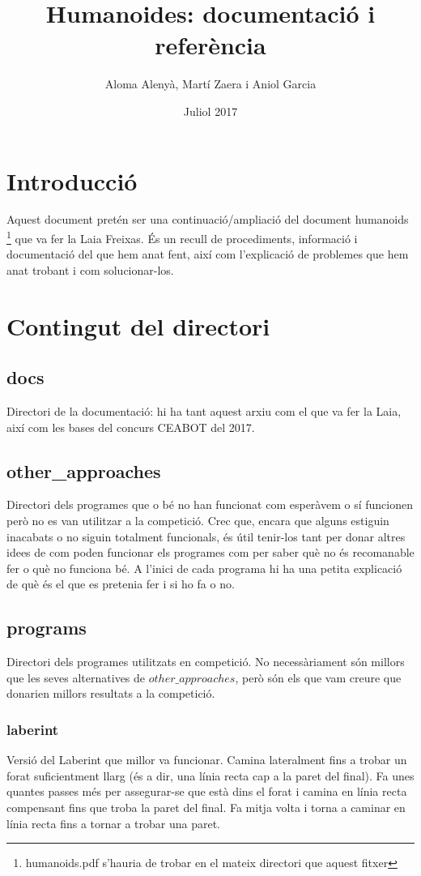 \documentclass{article}
\title{Humanoides: documentació i referència} %
\author{Aloma Alenyà, Martí Zaera i Aniol Garcia}
\date{Juliol 2017}
\begin{document}
\maketitle
\section{Introducció}
Aquest document pretén ser una continuació/ampliació del document humanoids \footnote{humanoids.pdf s'hauria de trobar en el mateix directori que aquest fitxer} que va fer la Laia Freixas. És un recull de procediments, informació i documentació del que hem anat fent, així com l'explicació de problemes que hem anat trobant i com solucionar-los. 
\section{Contingut del directori}
\subsection{docs}
Directori de la documentació: hi ha tant aquest arxiu com el que va fer la Laia, així com les bases del concurs CEABOT del 2017.
\subsection{other\_approaches}
Directori dels programes que o bé no han funcionat com esperàvem o sí funcionen però no es van utilitzar a la competició. Crec que, encara que alguns estiguin inacabats o no siguin totalment funcionals, és útil tenir-los tant per donar altres idees de com poden funcionar els programes com per saber què no és recomanable fer o què no funciona bé. A l'inici de cada programa hi ha una petita explicació de què és el que es pretenia fer i si ho fa o no.
\subsection{programs}
Directori dels programes utilitzats en competició. No necessàriament són millors que les seves alternatives de $other\_approaches$, però són els que vam creure que donarien millors resultats a la competició.
\subsubsection{laberint}
Versió del Laberint que millor va funcionar. Camina lateralment fins a trobar un forat suficientment llarg (és a dir, una línia recta cap a la paret del final). Fa unes quantes passes més per assegurar-se que està dins el forat i camina en línia recta compensant fins que troba la paret del final. Fa mitja volta i torna a caminar en línia recta fins a tornar a trobar una paret.
\end{document}
